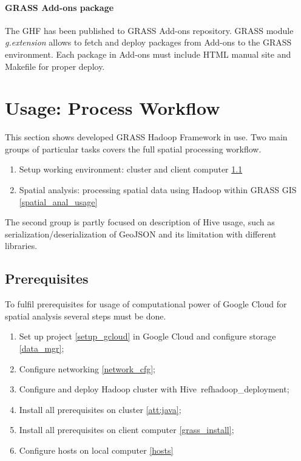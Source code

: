 \documentclass[a4paper,12pt,oneside]{report}
\begin{document}

	\paragraph{GRASS Add-ons package} The GHF has been published to GRASS Add-ons
	repository. GRASS module \textit{g.extension} allows to fetch and deploy packages
	from Add-ons to the GRASS environment. Each package in Add-ons must include HTML
	manual site and Makefile for proper deploy. 
	
	
	
	\section{Usage: Process Workflow}\label{sec:usage_spatial}
	This section shows  developed GRASS Hadoop Framework in use. Two main groups of particular tasks covers the full spatial processing workflow.
	\begin{enumerate}
	\item Setup working environment: cluster and client computer \ref{prereq}
	\item Spatial analysis: processing spatial data using Hadoop within GRASS GIS \ref{spatial_anal_usage}
	\end{enumerate}
	The second group is partly focused on description of
	Hive usage, such as serialization/deserialization of GeoJSON
	and its limitation with different libraries.
	
	\subsection{Prerequisites}\label{prereq}
	To fulfil prerequisites for usage of computational power of Google Cloud for spatial analysis several steps must be done.
	

	\begin{enumerate}
	\item Set up project \ref{setup_gcloud} in Google Cloud and configure storage \ref{data_mgr};
	\item Configure networking \ref{network_cfg};
	\item Configure and deploy Hadoop cluster with Hive\ ref{hadoop_deployment};
	\item Install all prerequisites on cluster \ref{att:java};
	\item Install all prerequisites on client computer \ref{grass_install};
	\item Configure hosts on local computer \ref{hosts}
	\end{enumerate}
\end{document}
